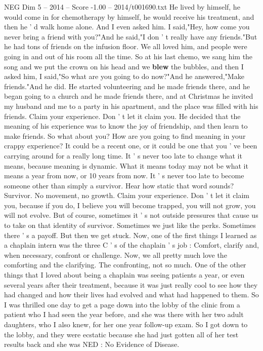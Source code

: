 \begin{textsample}{NEG Dim 5 – 2014 – Score -1.00 – 2014/t001690.txt}
He lived by himself, he would come in for chemotherapy by himself, he would receive his treatment, and then he ' d walk home alone.
And I even asked him.
I said,"Hey, how come you never bring a friend with you?"And he said,"I don ' t really have any friends."But he had tons of friends on the infusion floor.
We all loved him, and people were going in and out of his room all the time.
So at his last chemo, we sang him the song and we put the crown on his head and we \textbf{blew} the bubbles, and then I asked him, I said,"So what are you going to do now?"And he answered,"Make friends."And he did.
He started volunteering and he made friends there, and he began going to a church and he made friends there, and at Christmas he invited my husband and me to a party in his apartment, and the place was filled with his friends.
Claim your experience.
Don ' t let it claim you.
He decided that the meaning of his experience was to know the joy of friendship, and then learn to make friends.
So what about you?
How are you going to find meaning in your crappy experience?
It could be a recent one, or it could be one that you ' ve been carrying around for a really long time.
It ' s never too late to change what it means, because meaning is dynamic.
What it means today may not be what it means a year from now, or 10 years from now.
It ' s never too late to become someone other than simply a survivor.
Hear how static that word sounds?
Survivor.
No movement, no growth.
Claim your experience.
Don ' t let it claim you, because if you do, I believe you will become trapped, you will not grow, you will not evolve.
But of course, sometimes it ' s not outside pressures that cause us to take on that identity of survivor.
Sometimes we just like the perks.
Sometimes there ' s a payoff.
But then we get stuck.
Now, one of the first things I learned as a chaplain intern was the three C ' s of the chaplain ' s job : Comfort, clarify and, when necessary, confront or challenge.
Now, we all pretty much love the comforting and the clarifying.
The confronting, not so much.
One of the other things that I loved about being a chaplain was seeing patients a year, or even several years after their treatment, because it was just really cool to see how they had changed and how their lives had evolved and what had happened to them.
So I was thrilled one day to get a page down into the lobby of the clinic from a patient who I had seen the year before, and she was there with her two adult daughters, who I also knew, for her one year follow-up exam.
So I got down to the lobby, and they were ecstatic because she had just gotten all of her test results back and she was NED : No Evidence of Disease.

\end{textsample}
